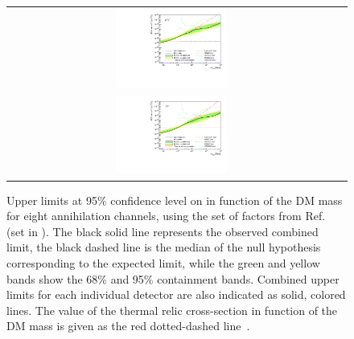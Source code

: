 \begin{figure}[h!]
{\begin{tabular}{cc}
    \includegraphics[width=0.35\textwidth]{figures/glory_duck/limits/Glory_Duck_Annihilation_mumu_Geringer-Sameth_Combination_bands.pdf} \\
    \includegraphics[width=0.35\textwidth]{figures/glory_duck/limits/Glory_Duck_Annihilation_tautau_Geringer-Sameth_Combination_bands.pdf} &
    \end{tabular}
    }
    \caption{Upper limits at 95\% confidence level on \sv in function of the DM mass for eight annihilation channels, using the set of \J factors from Ref.~\cite{Geringer-Sameth:2014yza} (\GS set in ). The black solid line represents the observed combined limit, the black dashed line is the median of the null hypothesis corresponding to the expected limit, while the green and yellow bands show the 68\% and 95\% containment bands. Combined upper limits for each individual detector are also indicated as solid, colored lines.
    The value of the thermal relic cross-section in function of the DM mass is given as the red dotted-dashed line~\cite{Bertone_2005}.}
\label{fig:limits-geringer-sameth}
\end{figure}


